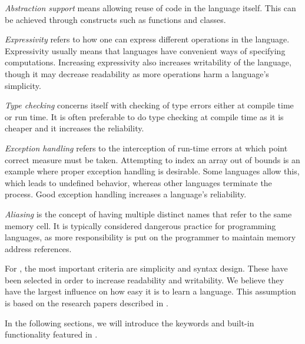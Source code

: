 \textit{Abstraction support} means allowing reuse of code in the language itself. 
This can be achieved through constructs such as functions and classes.

\textit{Expressivity} refers to how one can express different operations in the language.
Expressivity usually means that languages have convenient ways of specifying computations. 
Increasing expressivity also increases writability of the language, though it may decrease readability as more operations harm a language's simplicity.
 
\textit{Type checking} concerns itself with checking of type errors either at compile time or run time. 
It is often preferable to do type checking at compile time as it is cheaper and it increases the reliability.

\textit{Exception handling} refers to the interception of run-time errors at which point correct measure must be taken. 
Attempting to index an array out of bounds is an example where proper exception handling is desirable.
Some languages allow this, which leads to undefined behavior, whereas other languages terminate the process.
Good exception handling increases a language's reliability.

\textit{Aliasing} is the concept of having multiple distinct names that refer to the same memory cell. 
It is typically considered dangerous practice for programming languages, as more responsibility is put on the programmer to maintain memory address references.

For \dazel{}, the most important criteria are simplicity and syntax design.
These have been selected in order to increase readability and writability. 
We believe they have the largest influence on how easy it is to learn a language.
This assumption is based on the research papers described in .

In the following sections, we will introduce the keywords and built-in functionality featured in \dazel{}.